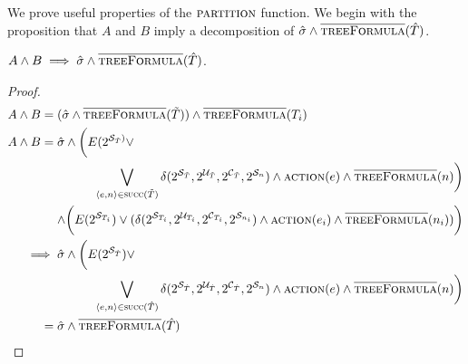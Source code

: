 We prove useful properties of the $\textsc{partition}$ function. We begin with the proposition that $A$ and $B$ imply a decomposition of $\hat{\sigma} \land \textsc{$\overline{\mbox{treeFormula}}$}(\hat{T})$. 
\begin{proposition}\label{prop:aandb}
    $A\land B \implies \hat{\sigma} \land \textsc{$\overline{\mbox{treeFormula}}$}(\hat{T})$.
\end{proposition}
\begin{proof}
    \begin{align*}
        A \land B ={}& (\hat{\sigma} \land \opptf(\tilde{T})) \land \opptf(T_i) \\
        A \land B ={}& \hat{\sigma} \land \bigg( E(2^{\mathcal{S}_{\tilde{T}})} \lor \\
                     & \pushright{ \bigvee_{\langle e, n \rangle \in \textsc{succ}(\tilde{T})} \delta(2^{\mathcal{S}_{\tilde{T}}}, 2^{\mathcal{U}_{\tilde{T}}}, 2^{\mathcal{C}_{\tilde{T}}}, 2^{\mathcal{S}_n}) \land \textsc{action}(e) \land \opptf(n) \bigg)} \\
                     & \pushright{\land \bigg( E(2^{\mathcal{S}_{T_i}}) \lor (\delta(2^{\mathcal{S}_{T_i}}, 2^{\mathcal{U}_{T_i}}, 2^{\mathcal{C}_{T_i}}, 2^{\mathcal{S}_{n_i}}) \land \textsc{action}(e_i) \land \opptf(n_i)) \bigg)} \\
        \implies{}& \hat{\sigma} \land \bigg( E(2^{\mathcal{S}_{\hat{T}}}) \lor \\
                  & \pushright{  \bigvee_{\langle e, n \rangle \in \textsc{succ}(\hat{T})} \delta(2^{\mathcal{S}_{\hat{T}}}, 2^{\mathcal{U}_{\hat{T}}}, 2^{\mathcal{C}_{\hat{T}}}, 2^{\mathcal{S}_n}) \land \textsc{action}(e) \land \opptf(n) \bigg)} \\
        ={}& \hat{\sigma} \land \opptf(\hat{T})
    \end{align*}
\end{proof}

